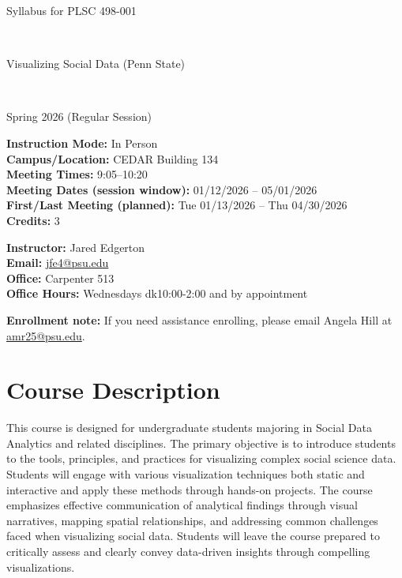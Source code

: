 \documentclass[letterpaper,11pt]{article}
\begin{document}
\begin{center}
\begin{Large} Syllabus for PLSC 498-001 \end{Large}\\
\begin{large} Visualizing Social Data (Penn State) \end{large}\\
\begin{large} Spring 2026 (Regular Session) \end{large}
\end{center}

\noindent \textbf{Instruction Mode:} In Person\\
\noindent \textbf{Campus/Location:} 	
CEDAR Building 134\\
\noindent \textbf{Meeting Times:} 9:05--10:20\\
\noindent \textbf{Meeting Dates (session window):} 01/12/2026 -- 05/01/2026\\
\noindent \textbf{First/Last Meeting (planned):} Tue 01/13/2026 -- Thu 04/30/2026\\
\noindent \textbf{Credits:} 3\\\bigskip

\noindent \textbf{Instructor:} Jared Edgerton\\
\noindent \textbf{Email:} \href{mailto:jfe4@psu.edu}{jfe4@psu.edu}\\
\noindent \textbf{Office:} Carpenter 513\\
\noindent \textbf{Office Hours:} Wednesdays dk10:00-2:00 and by appointment\\\medskip

\noindent \textbf{Enrollment note:} If you need assistance enrolling, please email Angela Hill at \href{mailto:amr25@psu.edu}{amr25@psu.edu}.\\

\section*{Course Description}
This course is designed for undergraduate students majoring in Social Data Analytics and related disciplines. The primary objective is to introduce students to the tools, principles, and practices for visualizing complex social science data. Students will engage with various visualization techniques both static and interactive and apply these methods through hands-on projects. The course emphasizes effective communication of analytical findings through visual narratives, mapping spatial relationships, and addressing common challenges faced when visualizing social data. Students will leave the course prepared to critically assess and clearly convey data-driven insights through compelling visualizations.
\end{document}
